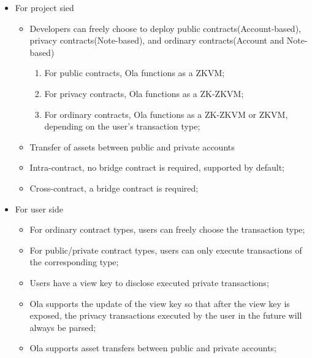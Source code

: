 \begin{itemize}
\item For project sied
    \begin{itemize}
    \item Developers can freely choose to deploy public contracts(Account-based), privacy contracts(Note-based), and ordinary contracts(Account and Note-based)
        \begin{enumerate}
        \item For public contracts, Ola functions as a ZKVM;
        \item For privacy contracts, Ola functions as a ZK-ZKVM;
        \item For ordinary contracts, Ola functions as a ZK-ZKVM or ZKVM, depending on the user's transaction type;
        \end{enumerate}
    \item Transfer of assets between public and private accounts
    \item Intra-contract, no bridge contract is required, supported by default;
    \item Cross-contract, a bridge contract is required;
    \end{itemize}
\item For user side
    \begin{itemize}
    \item For ordinary contract types, users can freely choose the transaction type;
    \item For public/private contract types, users can only execute transactions of the corresponding type;
    \item Users have a view key to disclose executed private transactions;
    \item Ola supports the update of the view key so that after the view key is exposed, the privacy transactions executed by the user in the future will always be parsed;
    \item Ola supports asset transfers between public and private accounts;
    \end{itemize}
\end{itemize}
